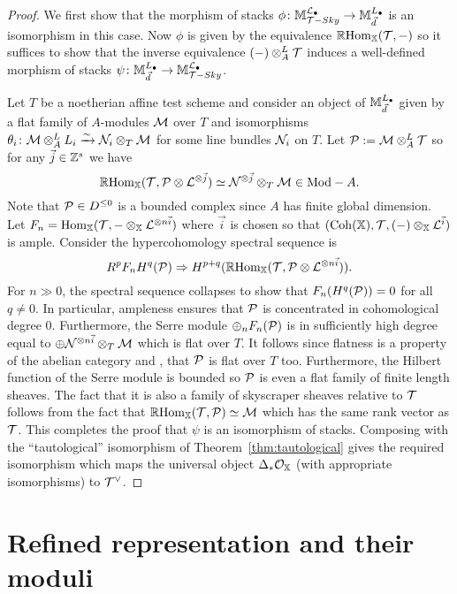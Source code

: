 \documentclass[12pt]{amsart}
\begin{document}
\begin{proof}
We first show that the morphism of stacks $\phi \colon \mathbb{M}_{\mathcal{T}-Sky}^{\mathcal{L}_{\bullet}} \to \mathbb{M}_{\vec{d}}^{L_{\bullet}}$ is an isomorphism in this case. Now $\phi$ is given by the equivalence $\mathop{\mathbb{R}\mathrm{Hom}}\nolimits_{\mathbb{X}}(\mathcal{T}, -)$ so it suffices to show that the inverse equivalence $(-) \otimes^L_A \mathcal{T}$ induces a well-defined morphism of stacks $\psi \colon \mathbb{M}_{\vec{d}}^{L_{\bullet}} \to \mathbb{M}_{\mathcal{T}-Sky}^{\mathcal{L}_{\bullet}}$. 

Let $T$ be a noetherian affine test scheme and consider an object of $\mathbb{M}_{\vec{d}}^{L_{\bullet}}$ given by a flat family of $A$-modules $\mathcal{M}$ over $T$ and isomorphisms $\theta_i \colon \mathcal{M} \otimes_A^L L_i \xrightarrow{\sim} \mathcal{N}_i \otimes_T \mathcal{M}$ for some line bundles $\mathcal{N}_i$ on $T$. Let $\mathcal{P} := \mathcal{M} \otimes_A^L \mathcal{T}$ so for any $\vec{j} \in \mathbb{Z}^s$ we have
$$\mathop{\mathbb{R}\mathrm{Hom}}\nolimits_{\mathbb{X}}(\mathcal{T}, \mathcal{P} \otimes \mathcal{L}^{\otimes \vec{j}}) \simeq \mathcal{N}^{\otimes \vec{j}} \otimes_T \mathcal{M} \in \textup{Mod}-A.$$
Note that $\mathcal{P} \in D^{\leq 0}$ is a bounded complex since $A$ has finite global dimension. Let $F_n = \operatorname{Hom}_{\mathbb{X}}(\mathcal{T}, - \otimes_{\mathbb{X}} \mathcal{L}^{\otimes n \vec{i}})$ where $\vec{i}$ is chosen so that $(\operatorname{Coh}(\mathbb{X}), \mathcal{T}, (-)\otimes_{\mathbb{X}} \mathcal{L}^{\vec{i}})$ is ample. Consider the hypercohomology spectral sequence is 
$$ R^pF_n H^q(\mathcal{P}) \Rightarrow H^{p+q}(\mathop{\mathbb{R}\mathrm{Hom}}\nolimits_{\mathbb{X}}(\mathcal{T}, \mathcal{P} \otimes \mathcal{L}^{\otimes n\vec{i}})).$$
For $n\gg 0$, the spectral sequence collapses to show that $F_n(H^q(\mathcal{P})) = 0$ for all $q \neq 0$. In particular, ampleness ensures that $\mathcal{P}$ is concentrated in cohomological degree 0. Furthermore, the Serre module $\oplus_n F_n(\mathcal{P})$ is in sufficiently high degree equal to 
$\oplus \mathcal{N}^{\otimes n \vec{i}} \otimes_T \mathcal{M}$ which is flat over $T$. It follows since flatness is a property of the abelian category and \cite{AZ94}, that $\mathcal{P}$ is flat over $T$ too. Furthermore, the Hilbert function of the Serre module is bounded so $\mathcal{P}$ is even a flat family of finite length sheaves. The fact that it is also a family of skyscraper sheaves relative to $\mathcal{T}$ follows from the fact that $\mathop{\mathbb{R}\mathrm{Hom}}\nolimits_{\mathbb{X}}(\mathcal{T}, \mathcal{P}) \simeq \mathcal{M}$ which has the same rank vector as $\mathcal{T}$. This completes the proof that $\psi$ is an isomorphism of stacks. Composing with the ``tautological'' isomorphism of Theorem~\ref{thm:tautological} gives the required isomorphism which maps the universal object $\Delta_{*}\mathcal{O}_{\mathbb{X}}$ (with appropriate isomorphisms) to $\mathcal{T}^{\vee}$. 
\end{proof}

\section{Refined representation and their moduli}\label{sec:refined}
\end{document}
